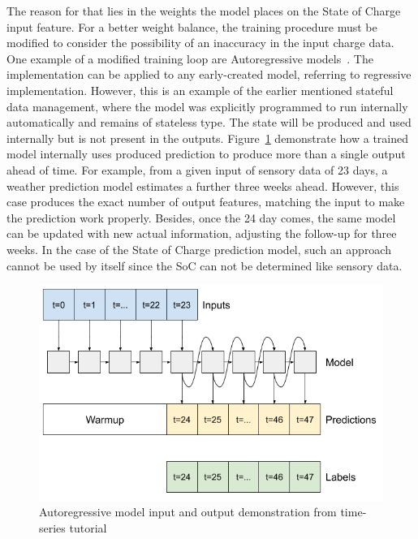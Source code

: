%
%
The reason for that lies in the weights the model places on the State of Charge input feature.
For a better weight balance, the training procedure must be modified to consider the possibility of an inaccuracy in the input charge data.
One example of a modified training loop are Autoregressive models~\cite{time_2020}.
The implementation can be applied to any early-created model, referring to regressive implementation.
However, this is an example of the earlier mentioned stateful data management, where the model was explicitly programmed to run internally automatically and remains of stateless type.
The state will be produced and used internally but is not present in the outputs.
\mbox{Figure~\ref{fig:autoregressive}} demonstrate how a trained model internally uses produced prediction to produce more than a single output ahead of time.
For example, from a given input of sensory data of 23 days, a weather prediction model estimates a further three weeks ahead.
However, this case produces the exact number of output features, matching the input to make the prediction work properly.
Besides, once the 24 day comes, the same model can be updated with new actual information, adjusting the follow-up for three weeks.
In the case of the State of Charge prediction model, such an approach cannot be used by itself since the SoC can not be determined like sensory data.
\begin{figure}[ht]
    \centering
    \includegraphics[width=\columnwidth]{II_Body/images/multistep_autoregressive.png}
    \caption{Autoregressive model input and output demonstration from time-series tutorial~\cite{time_2020}}
    \label{fig:autoregressive}
\end{figure}


